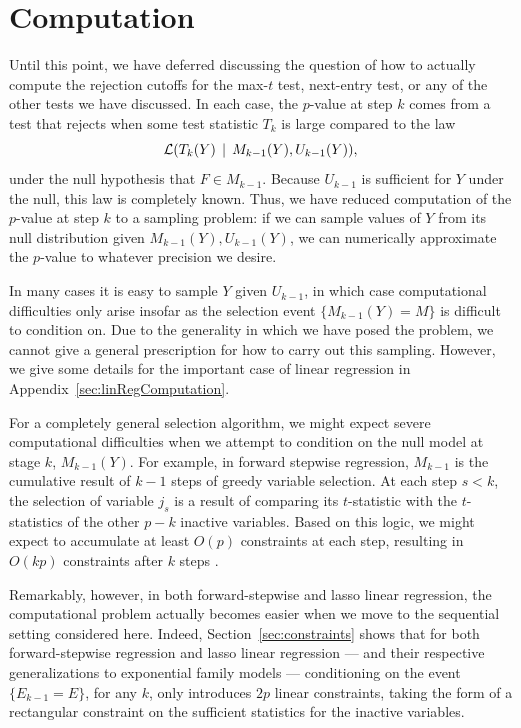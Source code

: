 \documentclass{article}
\begin{document}
\section{Computation}
\label{sec:computation}

Until this point, we have deferred discussing the question of how to actually compute the rejection cutoffs for the max-$t$ test, next-entry test, or any of the other tests we have discussed. In each case, the $p$-value at step $k$ comes from a test that rejects when some test statistic $T_k$ is large compared to the law
\begin{equation}\label{eq:genDist}
\mathcal{L}(T_k(Y) \,\mid\, M_{k-1}(Y), U_{k-1}(Y)),
\end{equation}
under the null hypothesis that $F\in M_{k-1}$. Because $U_{k-1}$ is sufficient for $Y$ under the null, this law is completely known. Thus, we have reduced computation of the $p$-value at step $k$ to a sampling problem: if we can sample values of $Y$ from its null distribution given $M_{k-1}(Y), U_{k-1}(Y)$, we can numerically approximate the $p$-value to whatever precision we desire.

In many cases it is easy to sample $Y$ given $U_{k-1}$, in which case computational difficulties only arise insofar as the selection event $\{M_{k-1}(Y)=M\}$ is difficult to condition on. Due to the generality in which we have posed the problem, we cannot give a general prescription for how to carry out this sampling. However, we give some details for the important case of linear regression in Appendix~\ref{sec:linRegComputation}.

For a completely general selection algorithm, we might expect severe computational difficulties when we attempt to condition on the null model at stage $k$, $M_{k-1}(Y)$. For example, in forward stepwise regression, $M_{k-1}$ is the cumulative result of $k-1$ steps of greedy variable selection. At each step $s<k$, the selection of variable $j_s$ is a result of comparing its $t$-statistic with the $t$-statistics of the other $p-k$ inactive variables. Based on this logic, we might expect to accumulate at least $O(p)$ constraints at each step, resulting in $O(kp)$ constraints after $k$ steps \citep{taylor2014exact}.

Remarkably, however, in both forward-stepwise and lasso linear regression, the computational problem actually becomes easier when we move to the sequential setting considered here. Indeed, Section~\ref{sec:constraints} shows that for both forward-stepwise regression and lasso linear regression --- and their respective generalizations to exponential family models --- conditioning on the event $\{E_{k-1}=E\}$, for any $k$, only introduces $2p$ linear constraints, taking the form of a rectangular constraint on the sufficient statistics for the inactive variables.
\end{document}
